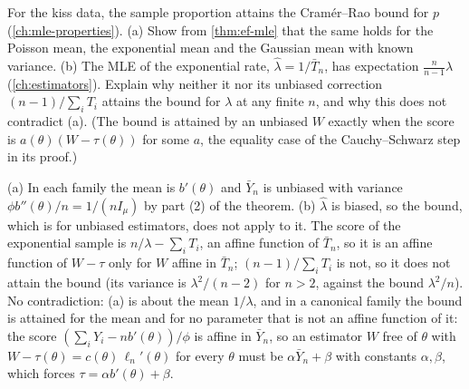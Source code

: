 \begin{exercise}
\label{ex:ef-cr-attained}
For the kiss data, the sample proportion attains the Cram\'er--Rao bound for $p$ (\cref{ch:mle-properties}). (a) Show from \cref{thm:ef-mle} that the same holds for the Poisson mean, the exponential mean and the Gaussian mean with known variance. (b) The MLE of the exponential rate, $\hat{\lambda} = 1/\bar{T}_n$, has expectation $\frac{n}{n-1}\lambda$ (\cref{ch:estimators}). Explain why neither it nor its unbiased correction $(n-1)/\sum_i T_i$ attains the bound for $\lambda$ at any finite $n$, and why this does not contradict (a). (The bound is attained by an unbiased $W$ exactly when the score is $a(\theta)(W - \tau(\theta))$ for some $a$, the equality case of the Cauchy--Schwarz step in its proof.)
\end{exercise}
\begin{solution}
(a) In each family the mean is $b'(\theta)$ and $\bar{Y}_n$ is unbiased with variance $\phi b''(\theta)/n = 1/(nI_\mu)$ by part (2) of the theorem. (b) $\hat{\lambda}$ is biased, so the bound, which is for unbiased estimators, does not apply to it. The score of the exponential sample is $n/\lambda - \sum_i T_i$, an affine function of $\bar{T}_n$, so it is an affine function of $W - \tau$ only for $W$ affine in $\bar{T}_n$; $(n - 1)/\sum_i T_i$ is not, so it does not attain the bound (its variance is $\lambda^2/(n - 2)$ for $n > 2$, against the bound $\lambda^2/n$). No contradiction: (a) is about the mean $1/\lambda$, and in a canonical family the bound is attained for the mean and for no parameter that is not an affine function of it: the score $(\sum_i Y_i - nb'(\theta))/\phi$ is affine in $\bar{Y}_n$, so an estimator $W$ free of $\theta$ with $W - \tau(\theta) = c(\theta)\,\ell_n'(\theta)$ for every $\theta$ must be $\alpha\bar{Y}_n + \beta$ with constants $\alpha, \beta$, which forces $\tau = \alpha b'(\theta) + \beta$.
\end{solution}

